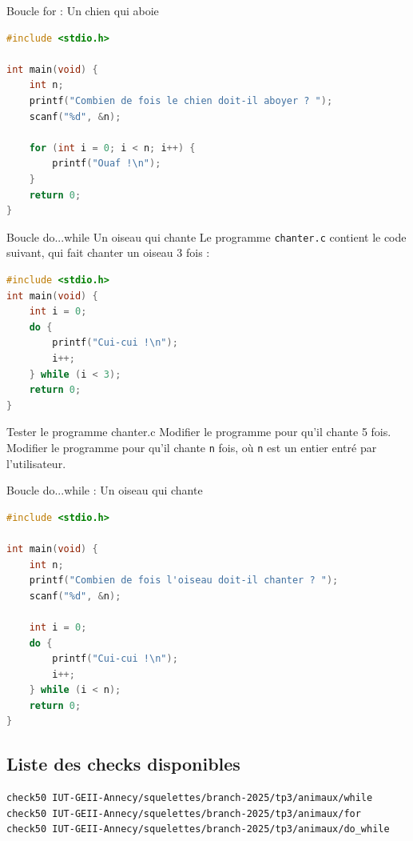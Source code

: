 \begin{UPSTIcorrectionP}{Boucle for : Un chien qui aboie}
	\begin{lstlisting}[language=c]
#include <stdio.h>

int main(void) {
    int n;
    printf("Combien de fois le chien doit-il aboyer ? ");
    scanf("%d", &n);

    for (int i = 0; i < n; i++) {
        printf("Ouaf !\n");
    }
    return 0;
}
	\end{lstlisting}
\end{UPSTIcorrectionP}



\begin{UPSTIexercice}{Boucle do...while Un oiseau qui chante}
	Le programme \texttt{chanter.c} contient le code suivant, qui fait chanter un oiseau 3 fois :
	\begin{lstlisting}[language=c]
#include <stdio.h>
int main(void) {
    int i = 0;
    do {
        printf("Cui-cui !\n");
        i++;
    } while (i < 3);
    return 0;
}
\end{lstlisting}
	\UPSTIetape Tester le programme chanter.c
	\UPSTIetape Modifier le programme pour qu'il chante 5 fois.
	\UPSTIetape Modifier le programme pour qu'il chante \texttt{n} fois, où \texttt{n} est un entier entré par l'utilisateur.
\end{UPSTIexercice}

\begin{UPSTIcorrectionP}{Boucle do...while : Un oiseau qui chante}
	\begin{lstlisting}[language=c]
#include <stdio.h>

int main(void) {
    int n;
    printf("Combien de fois l'oiseau doit-il chanter ? ");
    scanf("%d", &n);

    int i = 0;
    do {
        printf("Cui-cui !\n");
        i++;
    } while (i < n);
    return 0;
}
	\end{lstlisting}
\end{UPSTIcorrectionP}

\subsection*{Liste des checks disponibles}
\begin{lstlisting}[language=bash,style=console]
check50 IUT-GEII-Annecy/squelettes/branch-2025/tp3/animaux/while
check50 IUT-GEII-Annecy/squelettes/branch-2025/tp3/animaux/for
check50 IUT-GEII-Annecy/squelettes/branch-2025/tp3/animaux/do_while
\end{lstlisting}
